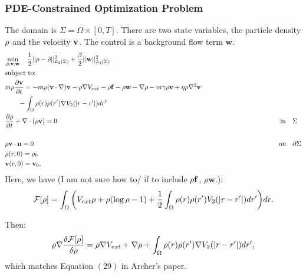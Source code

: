 
\subsubsection{PDE-Constrained Optimization Problem}
The domain is $\Sigma=\Omega \times [0,T]$. There are two state variables, the particle density $\rho$ and the velocity $\mathbf{v}$. The control is a background flow term $\mathbf{w}$. 
\begin{align*}
&\min_{\rho,\mathbf{v},\mathbf{w} } \quad \frac{1}{2}||\rho - \hat {\rho}||_{L_2(\Sigma)}^2  +\frac{\beta}{2}||\mathbf{w}||_{L_2(\Sigma)}^2\\
&\text{subject to:}\\
&m \rho \frac{\partial \mathbf{v}}{\partial t}= - m \rho (\mathbf{v} \cdot \nabla)\mathbf{v} -\rho \nabla V_{ext} -\rho \mathbf{f} -\rho \mathbf{w} - \nabla \rho - m\gamma \rho \mathbf{v} + \eta \rho \nabla^2 \mathbf{v} \\
& \quad \quad -\int_\Omega \rho(r) \rho(r') \nabla V_2(|r-r'|)dr' \\
&\frac{\partial \rho}{\partial t} + \nabla \cdot (\rho \mathbf{v})=0 \qquad\qquad \qquad\qquad\qquad\quad \quad\quad\qquad \qquad\qquad \qquad\qquad\qquad\quad \qquad\qquad\qquad\quad\ \ \text{in} \quad \Sigma\\
\\
&\rho \mathbf{v} \cdot \mathbf{n} =0\qquad\qquad \qquad\qquad\qquad\qquad\qquad\qquad\qquad \qquad\qquad \qquad\qquad\qquad \qquad\qquad\qquad\quad \qquad \text{on} \quad \partial  \Sigma\\
& \rho(r,0)=\rho_0\\
& \mathbf{v}(r,0)=\mathbf{v}_0.
\end{align*}
Here, we have (I am not sure how to/ if to include $\rho \mathbf{f}$, $\rho \mathbf{w}$.):
\begin{align*}
\mathcal{F}[\rho]=\int_\Omega  \bigg( V_{ext}\rho + \rho (\log \rho -1) +  \frac{1}{2}\int_\Omega \rho(r) \rho(r')V_2(|r-r'|)dr' \bigg) dr.
\end{align*}

Then:
\begin{align*}
\rho \nabla \frac{\delta \mathcal{F}[\rho]}{\delta \rho} = \rho \nabla V_{ext} + \nabla \rho + \int_\Omega \rho(r) \rho(r') \nabla V_2(|r-r'|)dr',
\end{align*}
which matches Equation $(29)$ in Archer's paper.
